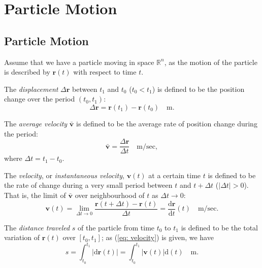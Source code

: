 
\chapter{Particle Motion}



\section{Particle Motion}
\label{sec: particle motion}


Assume that we have a particle moving in space $\mathbb R^n$, as the motion of the particle is described by $\mathbf r(t)$ with respect to time $t$.

The \textit{displacement} $\Delta \mathbf r$ between $t_1$ and $t_0$  ($t_0 < t_1$) is defined to be the position change over the period $(t_0, t_1)$:
\begin{equation}
	\label{eq: displacement}
	\Delta \mathbf r = \mathbf r(t_1) - \mathbf r(t_0) \quad \mathrm {m}.
\end{equation}

The \textit{average velocity} $\mathbf{\bar v}$ is defined to be the average rate of position change during the period:
\begin{equation}
	\label{eq: ave velocity}
	\mathbf{\bar v} = \frac{\Delta \mathbf r}{\Delta t} \quad \mathrm{m / sec},
\end{equation}
where $\Delta t = t_1 - t_0$.

The \textit{velocity}, or \textit{instantaneous velocity}, $\mathbf v(t)$ at a certain time $t$ is defined to be the rate of change during a very small period between $t$ and $t + \Delta t$ ($|\Delta t| > 0$). That is, the limit of $\mathbf{\bar v}$ over neighbourhood of $t$ as $\Delta t \to 0$:
\begin{equation}
	\label{eq: velocity}
	\mathbf v(t) = \lim_{\Delta t \to 0} \frac{\mathbf r(t + \Delta t) - \mathbf r(t)}{\Delta t} = \frac{\mathrm d \mathbf r}{\mathrm d t}(t) \quad \mathrm{m/sec}.
\end{equation}

The \textit{distance traveled} $s$ of the particle from time $t_0$ to $t_1$ is defined to be the total variation of $\mathbf r(t)$ over $[t_0, t_1]$; as (\ref{eq: velocity}) is given, we have
\begin{equation}
	\label{eq: distance traveled}
	s = \int_{t_0}^{t_1} | \mathrm d\mathbf r(t) | = \int_{t_0}^{t_1} | \mathbf v(t) | \mathrm d(t) \quad \mathrm{m}.
\end{equation}

